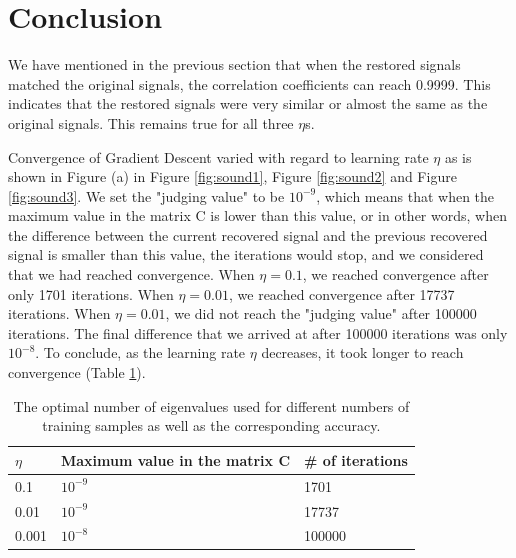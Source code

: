 \documentclass[UTF8,12pt]{article}
\begin{document}
	\section{Conclusion}
	We have mentioned in the previous section that when the restored signals matched the original signals, the correlation coefficients can reach 0.9999. This indicates that the restored signals were very similar or almost the same as the original signals. This remains true for all three $\eta$s.
	
	Convergence of Gradient Descent varied with regard to learning rate $\eta$ as is shown in Figure (a) in Figure \ref{fig:sound1}, Figure \ref{fig:sound2} and Figure \ref{fig:sound3}. We set the "judging value" to be $10^{-9}$, which means that when the maximum value in the matrix C is lower than this value, or in other words, when the difference between the current recovered signal and the previous recovered signal is smaller than this value, the iterations would stop, and we considered that we had reached convergence. When $\eta = 0.1$,  we reached convergence after only 1701 iterations. When $\eta = 0.01$,  we reached convergence after 17737 iterations. When $\eta = 0.01$,  we did not reach the "judging value" after 100000 iterations. The final difference that we arrived at after 100000 iterations was only  $10^{-8}$. To conclude, as the learning rate $\eta$ decreases, it took longer to reach convergence (Table \ref{table:convergence}).
	\begin{table}[]
		\begin{tabular}{l|l|l}
			\hline
			$\eta$ & Maximum value in the matrix C & \# of iterations \\\hline
			0.1    & $10^{-9}$                     & 1701             \\
			0.01   & $10^{-9}$                     & 17737            \\
			0.001  & $10^{-8}$                     & 100000           \\\hline
		\end{tabular}
		\caption{\label{table:convergence}The optimal number of eigenvalues used for different numbers of training samples as well as the corresponding accuracy.}
	\end{table}
\end{document}
